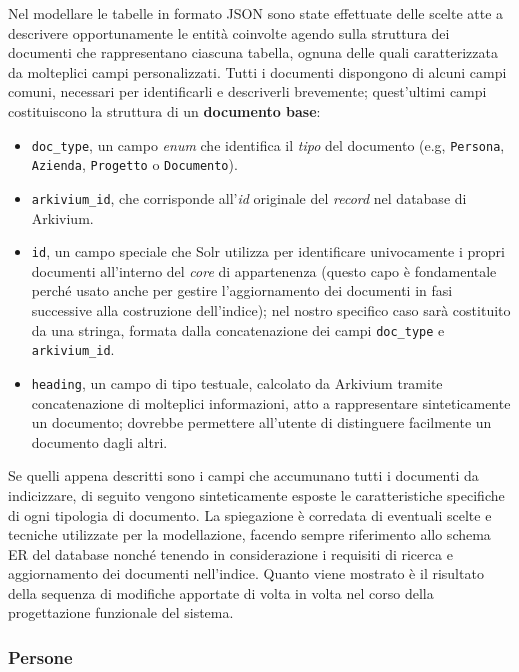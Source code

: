 Nel modellare le tabelle in formato JSON sono state effettuate delle scelte atte a descrivere opportunamente le entità coinvolte agendo sulla struttura dei documenti che rappresentano ciascuna tabella, ognuna delle quali caratterizzata da molteplici campi personalizzati. Tutti i documenti dispongono di alcuni campi comuni, necessari per identificarli e descriverli brevemente; quest’ultimi campi costituiscono la struttura di un \textbf{documento base}:
\begin{itemize}
\item \texttt{doc\_type}, un campo \textit{enum} che identifica il \textit{tipo} del documento (e.g, \texttt{Persona}, \texttt{Azienda}, \texttt{Progetto} o \texttt{Documento}).
\item \texttt{arkivium\_id}, che corrisponde all’\textit{id} originale del \textit{record} nel database di Arkivium.
\item \texttt{id}, un campo speciale che Solr utilizza per identificare univocamente i propri documenti all’interno del \textit{core} di appartenenza (questo capo è fondamentale perché usato anche per gestire l’aggiornamento dei documenti in fasi successive alla costruzione dell’indice); nel nostro specifico caso sarà costituito da una stringa, formata dalla concatenazione dei campi \texttt{doc\_type} e \texttt{arkivium\_id}.
\item \texttt{heading}, un campo di tipo testuale, calcolato da Arkivium tramite concatenazione di molteplici informazioni, atto a rappresentare sinteticamente un documento; dovrebbe permettere all’utente di distinguere facilmente un documento dagli altri.
\end{itemize}

Se quelli appena descritti sono i campi che accumunano tutti i documenti da indicizzare, di seguito vengono sinteticamente esposte le caratteristiche specifiche di ogni tipologia di documento. La spiegazione è corredata di eventuali scelte e tecniche utilizzate per la modellazione, facendo sempre riferimento allo schema ER del database nonché tenendo in considerazione i requisiti di ricerca e aggiornamento dei documenti nell’indice. Quanto viene mostrato è il risultato della sequenza di modifiche apportate di volta in volta nel corso della progettazione funzionale del sistema.


\subsubsection{Persone}

